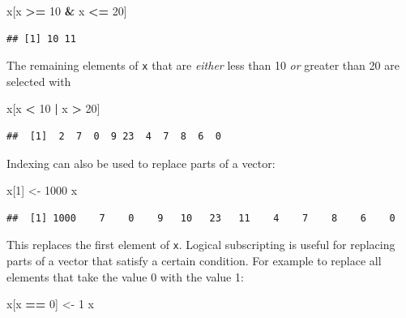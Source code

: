 \documentclass[
]{book}
\newenvironment{Shaded}{\begin{snugshade}}{\end{snugshade}}
\newcommand{\DecValTok}[1]{\textcolor[rgb]{0.00,0.00,0.81}{#1}}
\newcommand{\NormalTok}[1]{#1}
\newcommand{\OtherTok}[1]{\textcolor[rgb]{0.56,0.35,0.01}{#1}}
\newcommand{\SpecialCharTok}[1]{\textcolor[rgb]{0.81,0.36,0.00}{\textbf{#1}}}
\begin{document}
\begin{Shaded}
\begin{Highlighting}[]
\NormalTok{x[x }\SpecialCharTok{\textgreater{}=} \DecValTok{10} \SpecialCharTok{\&}\NormalTok{ x }\SpecialCharTok{\textless{}=} \DecValTok{20}\NormalTok{]}
\end{Highlighting}
\end{Shaded}

\begin{verbatim}
## [1] 10 11
\end{verbatim}

The remaining elements of \texttt{x} that are \emph{either} less than 10
\emph{or} greater than 20 are selected with

\begin{Shaded}
\begin{Highlighting}[]
\NormalTok{x[x }\SpecialCharTok{\textless{}} \DecValTok{10} \SpecialCharTok{|}\NormalTok{ x }\SpecialCharTok{\textgreater{}} \DecValTok{20}\NormalTok{]}
\end{Highlighting}
\end{Shaded}

\begin{verbatim}
##  [1]  2  7  0  9 23  4  7  8  6  0
\end{verbatim}

Indexing can also be used to replace parts of a vector:

\begin{Shaded}
\begin{Highlighting}[]
\NormalTok{x[}\DecValTok{1}\NormalTok{] }\OtherTok{\textless{}{-}} \DecValTok{1000}
\NormalTok{x}
\end{Highlighting}
\end{Shaded}

\begin{verbatim}
##  [1] 1000    7    0    9   10   23   11    4    7    8    6    0
\end{verbatim}

This replaces the first element of \texttt{x}. Logical subscripting is
useful for replacing parts of a vector that satisfy a certain condition.
For example to replace all elements that take the value 0 with the value 1:

\begin{Shaded}
\begin{Highlighting}[]
\NormalTok{x[x }\SpecialCharTok{==} \DecValTok{0}\NormalTok{] }\OtherTok{\textless{}{-}} \DecValTok{1}
\NormalTok{x}
\end{Highlighting}
\end{Shaded}
\end{document}
